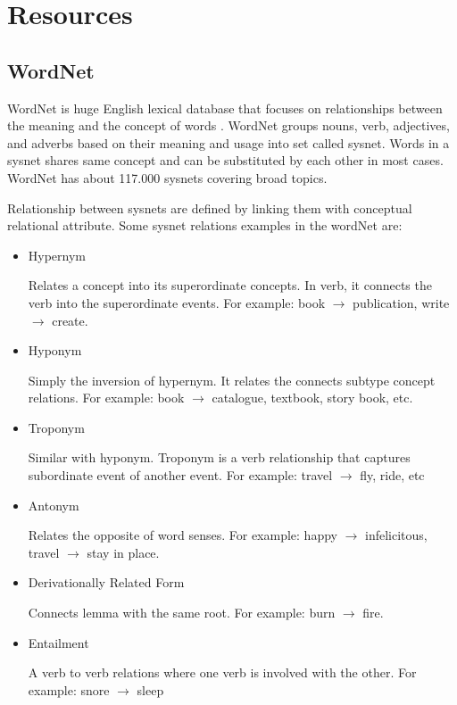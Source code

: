 \section{Resources}

\subsection{WordNet}

WordNet is huge English lexical database that focuses on relationships between the meaning and the concept of words \cite{wordnet1}\cite{wordnet2}. WordNet groups nouns, verb, adjectives, and adverbs based on their meaning and usage into set called sysnet. Words in a sysnet shares same concept and can be substituted by each other in most cases. WordNet has about 117.000 sysnets covering broad topics\cite{wordnet3}.

Relationship between sysnets are defined by linking them with conceptual relational attribute. Some sysnet relations examples in the wordNet are:
\begin{itemize}
	\item Hypernym
	
	Relates a concept into its superordinate concepts. In verb, it connects the verb into the superordinate events. For example: book $\rightarrow$ publication, write $\rightarrow$ create.
	\item Hyponym
	
	Simply the inversion of hypernym. It relates the connects subtype concept relations. For example: book $\rightarrow$ catalogue, textbook, story book, etc. 
	
	\item Troponym
	
	Similar with hyponym. Troponym is a verb relationship that captures subordinate event of another event. For example: travel $\rightarrow$ fly, ride, etc
	
	\item Antonym
	
	Relates the opposite of word senses. For example: happy $\rightarrow$ infelicitous, travel $\rightarrow$ stay in place.
	
	\item Derivationally Related Form
	
	Connects lemma with the same root. For example: burn $\rightarrow$ fire.
	
	\item Entailment 
	
	A verb to verb relations where one verb is involved with the other. For example: snore $\rightarrow$ sleep
	
\end{itemize}

